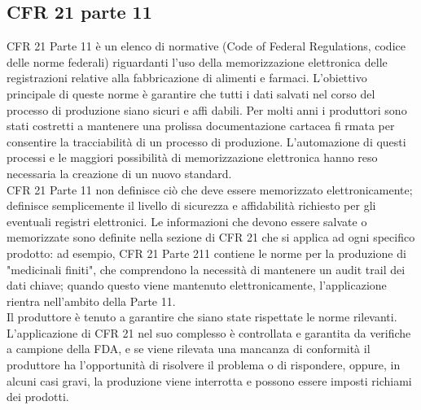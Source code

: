 \documentclass[12pt, a4paper, oneside]{book}
\begin{document}
\subsection{CFR 21 parte 11}
CFR 21 Parte 11 è un elenco di normative (Code of Federal Regulations, codice delle norme federali) riguardanti l'uso della memorizzazione elettronica delle registrazioni relative alla fabbricazione di alimenti e farmaci. L'obiettivo principale di queste norme è garantire che tutti i dati salvati nel corso del processo di produzione siano sicuri e affi dabili. Per molti anni i produttori sono stati costretti a mantenere una prolissa documentazione cartacea fi rmata
per consentire la tracciabilità di un processo di produzione. L'automazione di questi processi e le maggiori possibilità di memorizzazione elettronica hanno reso necessaria la creazione di un nuovo standard.\\
CFR 21 Parte 11 non definisce ciò che deve essere memorizzato elettronicamente; definisce semplicemente il livello di sicurezza e affidabilità richiesto per gli eventuali registri elettronici. Le informazioni che devono essere salvate o memorizzate sono definite nella sezione di CFR 21 che si applica ad ogni specifico prodotto: ad esempio, CFR 21 Parte 211 contiene le norme per la produzione di "medicinali finiti", che comprendono la necessità di mantenere un audit trail dei dati chiave; quando questo viene mantenuto elettronicamente, l'applicazione rientra nell'ambito della Parte 11.
\\Il produttore è tenuto a garantire che siano state rispettate le norme rilevanti. L'applicazione di CFR 21 nel suo complesso è controllata e garantita da verifiche a campione della FDA, e se viene rilevata una mancanza di conformità il produttore ha l'opportunità di risolvere il problema o di rispondere, oppure, in alcuni casi gravi, la produzione viene interrotta e possono essere imposti richiami dei prodotti.
\end{document}
